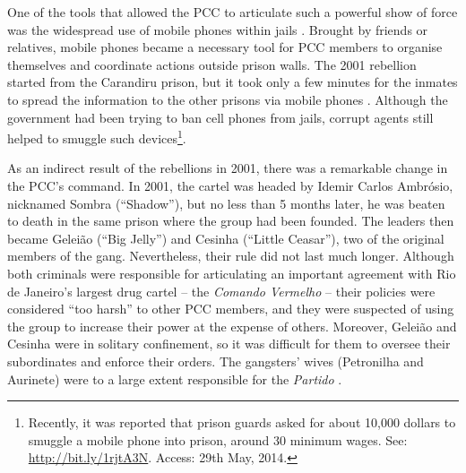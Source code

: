 One of the tools that allowed the PCC to articulate such a powerful show of force was the widespread use of mobile phones within jails \citep[]{santos2010dimensao}. Brought by friends or relatives, mobile phones became a necessary tool for PCC members to organise themselves and coordinate actions outside prison walls. The 2001 rebellion started from the Carandiru prison, but it took only a few minutes for the inmates to spread the information to the other prisons via mobile phones \citep[]{terra2001rebeliao}. Although the government had been trying to ban cell phones from jails, corrupt agents still helped to smuggle such devices\footnote{Recently, it was reported that prison guards asked for about 10,000 dollars to smuggle a mobile phone into prison, around 30 minimum wages. See: \href{http://bit.ly/1rjtA3N}{http://bit.ly/1rjtA3N}. Access: 29th May, 2014.}.

As an indirect result of the rebellions in 2001, there was a remarkable change in the PCC's command. In 2001, the cartel was headed by Idemir Carlos Ambr\'{o}sio, nicknamed Sombra (``Shadow''), but no less than 5 months later, he was beaten to death in the same prison where the group had been founded. The leaders then became Gelei\~{a}o (``Big Jelly'') and Cesinha (``Little Ceasar''), two of the original members of the gang. Nevertheless, their rule did not last much longer. Although both criminals were responsible for articulating an important agreement with Rio de Janeiro's largest drug cartel -- the \textit{Comando Vermelho} -- their policies were considered ``too harsh'' to other PCC members, and they were suspected of using the group to increase their power at the expense of others. Moreover, Gelei\~{a}o and Cesinha were in solitary confinement, so it was difficult for them to oversee their subordinates and enforce their orders. The gangsters' wives (Petronilha and Aurinete) were to a large extent responsible for the \textit{Partido} \citep{istoe2013marcola}. 

